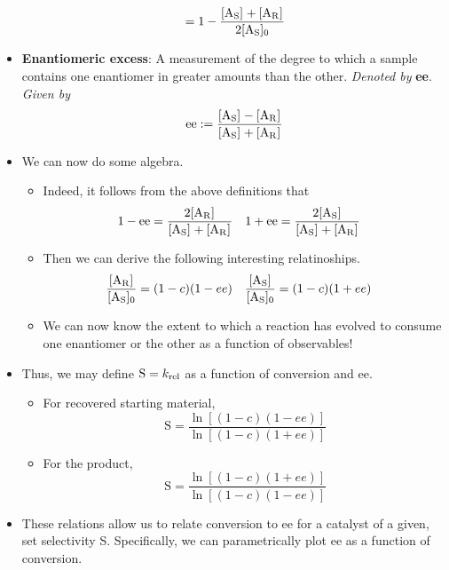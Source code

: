 \documentclass[../notes.tex]{subfiles}
\begin{document}
\begin{itemize}
\begin{equation*}
        = 1-\frac{\cnc{A_S}+\cnc{A_R}}{2\cnc[0]{A_S}}
    \end{equation*}
    \item \textbf{Enantiomeric excess}: A measurement of the degree to which a sample contains one enantiomer in greater amounts than the other. \emph{Denoted by} \textbf{ee}. \emph{Given by}
    \begin{equation*}
        \text{ee} := \frac{\cnc{A_S}-\cnc{A_R}}{\cnc{A_S}+\cnc{A_R}}
    \end{equation*}
    \item We can now do some algebra.
    \begin{itemize}
        \item Indeed, it follows from the above definitions that
        \begin{align*}
            1-\text{ee} &= \frac{2\cnc{A_R}}{\cnc{A_S}+\cnc{A_R}}&
            1+\text{ee} &= \frac{2\cnc{A_S}}{\cnc{A_S}+\cnc{A_R}}
        \end{align*}
        \item Then we can derive the following interesting relatinoships.
        \begin{align*}
            \frac{\cnc{A_R}}{\cnc[0]{A_S}} &= (1-c)(1-ee)&
            \frac{\cnc{A_S}}{\cnc[0]{A_S}} &= (1-c)(1+ee)
        \end{align*}
        \item We can now know the extent to which a reaction has evolved to consume one enantiomer or the other as a function of observables!
    \end{itemize}
    \item Thus, we may define $\text{S}=k_\textup{rel}$ as a function of conversion and ee.
    \begin{itemize}
        \item For recovered starting material,
        \begin{equation*}
            \text{S} = \frac{\ln[(1-c)(1-ee)]}{\ln[(1-c)(1+ee)]}
        \end{equation*}
        \item For the product,
        \begin{equation*}
            \text{S} = \frac{\ln[(1-c)(1+ee)]}{\ln[(1-c)(1-ee)]}
        \end{equation*}
    \end{itemize}
    \item These relations allow us to relate conversion to ee for a catalyst of a given, set selectivity S. Specifically, we can parametrically plot ee as a function of conversion.

\end{itemize}
\end{document}
